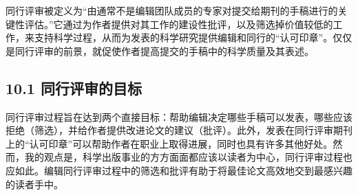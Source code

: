 同行评审被定义为“由通常不是编辑团队成员的专家对提交给期刊的手稿进行的关键性评估。”它通过为作者提供对其工作的建设性批评，以及筛选掉价值较低的工作，来支持科学过程，从而为发表的科学研究提供编辑和同行的“认可印章”。仅仅是同行评审的前景，就促使作者提高提交的手稿中的科学质量及其表述。

\subsection*{10.1 同行评审的目标}
同行评审过程旨在达到两个直接目标：帮助编辑决定哪些手稿可以发表，哪些应该拒绝（筛选），并给作者提供改进论文的建议（批评）。此外，发表在同行评审期刊上的“认可印章”可以帮助作者在职业上取得进展，同时也具有许多其他好处。然而，我的观点是，科学出版事业的方方面面都应该以读者为中心，同行评审过程也应如此。编辑同行评审过程中的筛选和批评有助于将最佳论文高效地交到最感兴趣的读者手中。

